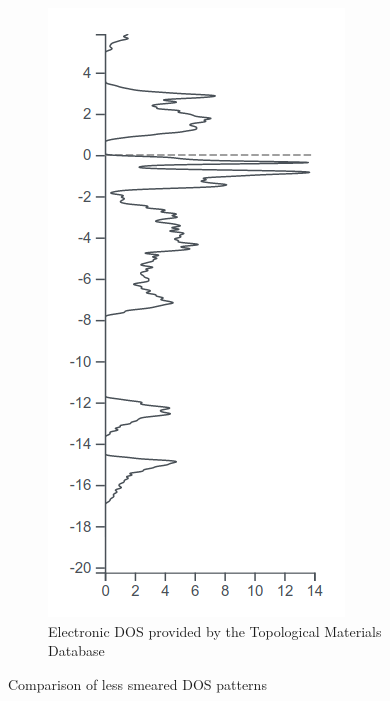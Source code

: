 \documentclass[11pt,a4paper]{article}
\begin{document}
\begin{figure}[H]
\begin{subfigure}[b]{0.3\textwidth}
\includegraphics[width=\textwidth]{images/dos3.png}
\caption{Electronic DOS provided by the Topological Materials Database}
\label{fig:dos3}
\end{subfigure}
\caption{Comparison of less smeared DOS patterns}
\label{fig:dosLessSmeared}
\end{figure}
\end{document}
